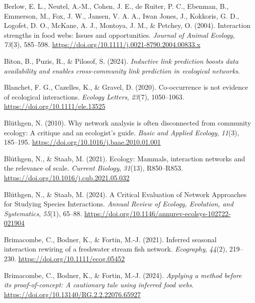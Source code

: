 \documentclass[
]{article}
\newlength{\cslhangindent}
\newenvironment{CSLReferences}[2] %
 {\begin{list}{}{%
  \setlength{\itemindent}{0pt}
  \setlength{\leftmargin}{0pt}
  \setlength{\parsep}{0pt}
  \ifodd #1
   \setlength{\leftmargin}{\cslhangindent}
   \setlength{\itemindent}{-1\cslhangindent}
  \fi
  \setlength{\itemsep}{#2\baselineskip}}}
 {\end{list}}
\begin{document}
\begin{CSLReferences}{1}{0}
Berlow, E. L., Neutel, A.-M., Cohen, J. E., de Ruiter, P. C., Ebenman,
B., Emmerson, M., Fox, J. W., Jansen, V. A. A., Iwan Jones, J.,
Kokkoris, G. D., Logofet, D. O., McKane, A. J., Montoya, J. M., \&
Petchey, O. (2004). Interaction strengths in food webs: Issues and
opportunities. \emph{Journal of Animal Ecology}, \emph{73}(3), 585--598.
\url{https://doi.org/10.1111/j.0021-8790.2004.00833.x}

Biton, B., Puzis, R., \& Pilosof, S. (2024). \emph{Inductive link
prediction boosts data availability and enables cross-community link
prediction in ecological networks}.

Blanchet, F. G., Cazelles, K., \& Gravel, D. (2020). Co-occurrence is
not evidence of ecological interactions. \emph{Ecology Letters},
\emph{23}(7), 1050--1063. \url{https://doi.org/10.1111/ele.13525}

Blüthgen, N. (2010). Why network analysis is often disconnected from
community ecology: {A} critique and an ecologist's guide. \emph{Basic
and Applied Ecology}, \emph{11}(3), 185--195.
\url{https://doi.org/10.1016/j.baae.2010.01.001}

Blüthgen, N., \& Staab, M. (2021). Ecology: {Mammals}, interaction
networks and the relevance of scale. \emph{Current Biology},
\emph{31}(13), R850--R853.
\url{https://doi.org/10.1016/j.cub.2021.05.032}

Blüthgen, N., \& Staab, M. (2024). A {Critical Evaluation} of {Network
Approaches} for {Studying Species Interactions}. \emph{Annual Review of
Ecology, Evolution, and Systematics}, \emph{55}(1), 65--88.
\url{https://doi.org/10.1146/annurev-ecolsys-102722-021904}

Brimacombe, C., Bodner, K., \& Fortin, M.-J. (2021). Inferred seasonal
interaction rewiring of a freshwater stream fish network.
\emph{Ecography}, \emph{44}(2), 219--230.
\url{https://doi.org/10.1111/ecog.05452}

Brimacombe, C., Bodner, K., \& Fortin, M.-J. (2024). \emph{Applying a
method before its proof-of-concept: {A} cautionary tale using inferred
food webs}. \url{https://doi.org/10.13140/RG.2.2.22076.65927}


\end{CSLReferences}
\end{document}
